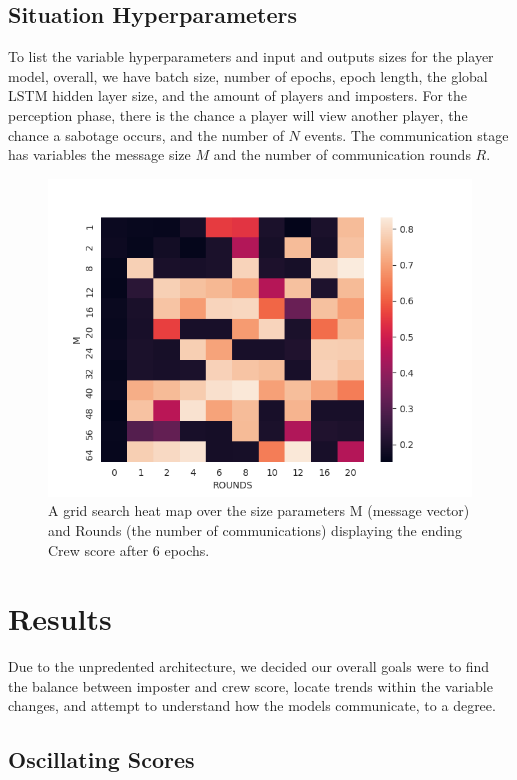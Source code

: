 \documentclass[10pt,twocolumn,letterpaper]{article}
\begin{document}
\subsection{Situation Hyperparameters}
To list the variable hyperparameters and input and outputs sizes for the player model,
overall, we have batch size, number of epochs, epoch length, the global LSTM hidden layer size, 
and the amount of players and imposters. For the perception phase, there is the
chance a player will view another player, the chance a sabotage occurs, and the number of $N$ events.  
The communication stage has variables the message size $M$ and the number of communication rounds
$R$.
\begin{figure}
   \begin{center}
      \includegraphics[width=0.8 \textwidth]{img/grid_search.png}
   \end{center}
      \caption{A grid search heat map over the size parameters M (message vector) 
      and Rounds (the number of communications) displaying the ending Crew score after 6 epochs.
      }
   \label{fig:model}
\end{figure}
\section{Results}
Due to the unpredented architecture, we decided our overall goals
were to find the balance between imposter and crew
score, locate trends within the variable changes, and attempt to 
understand how the models communicate, to a degree.
\subsection{Oscillating Scores}
\end{document}
